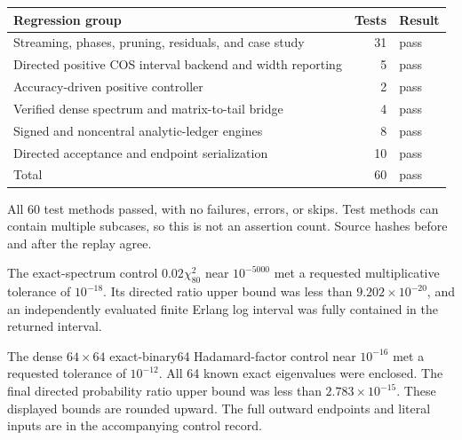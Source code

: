 \begin{center}
\begin{tabular}{@{}lrl@{}}
\toprule
Regression group & Tests & Result\\
\midrule
Streaming, phases, pruning, residuals, and case study & 31 & pass\\
Directed positive COS interval backend and width reporting & 5 & pass\\
Accuracy-driven positive controller & 2 & pass\\
Verified dense spectrum and matrix-to-tail bridge & 4 & pass\\
Signed and noncentral analytic-ledger engines & 8 & pass\\
Directed acceptance and endpoint serialization & 10 & pass\\
\midrule
Total & 60 & pass\\
\bottomrule
\end{tabular}
\end{center}

All 60 test methods passed, with no failures, errors, or skips. Test methods
can contain multiple subcases, so this is not an assertion count. Source
hashes before and after the replay agree.

The exact-spectrum control $0.02\chi^2_{80}$ near $10^{-5000}$ met a
requested multiplicative tolerance of $10^{-18}$. Its directed ratio upper
bound was less than $9.202\times10^{-20}$, and an independently evaluated
finite Erlang log interval was fully contained in the returned interval.

The dense $64\times64$ exact-binary64 Hadamard-factor control near
$10^{-16}$ met a requested tolerance of $10^{-12}$. All 64 known exact
eigenvalues were enclosed. The final directed probability ratio upper bound
was less than $2.783\times10^{-15}$. These displayed bounds are rounded
upward. The full outward endpoints and literal inputs are in the accompanying
control record.
